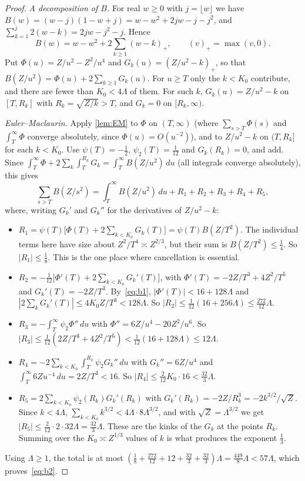 \begin{proof}
\emph{A decomposition of $B$.} For real $w\ge0$ with $j=\lfloor w\rfloor$ we have $B(w)=(w-j)(1-w+j)=w-w^2+2jw-j-j^2$, and $\sum_{k=1}^j2(w-k)=2jw-j^2-j$. Hence
\[
B(w)=w-w^2+2\sum_{k\ge1}(w-k)_+,\qquad(v)_+=\max(v,0).
\]
Put $\Phi(u)=Z/u^2-Z^2/u^4$ and $G_k(u)=(Z/u^2-k)_+$, so that $B(Z/u^2)=\Phi(u)+2\sum_{k\ge1}G_k(u)$. For $u\ge T$ only the $k<K_0$ contribute, and there are fewer than $K_0<4\Lambda$ of them. For such $k$, $G_k(u)=Z/u^2-k$ on $[T,R_k]$ with $R_k=\sqrt{Z/k}>T$, and $G_k=0$ on $[R_k,\infty)$.

\emph{Euler--Maclaurin.} Apply \cref{lem:EM} to $\Phi$ on $(T,\infty)$ (where $\sum_{s>T}\Phi(s)$ and $\int_T^\infty\Phi$ converge absolutely, since $\Phi(u)=O(u^{-2})$), and to $Z/u^2-k$ on $(T,R_k]$ for each $k<K_0$. Use $\psi(T)=-\frac12$, $\psi_2(T)=\frac1{12}$ and $G_k(R_k)=0$, and add. Since $\int_T^\infty\Phi+2\sum_k\int_T^{R_k}G_k=\int_T^\infty B(Z/u^2)\,du$ (all integrals converge absolutely), this gives
\[
\sum_{s>T}B(Z/s^2)=\int_T^\infty B(Z/u^2)\,du+R_1+R_2+R_3+R_4+R_5,
\]
where, writing $G_k'$ and $G_k''$ for the derivatives of $Z/u^2-k$:
\begin{itemize}
\item $R_1=\psi(T)\bigl[\Phi(T)+2\sum_{k<K_0}G_k(T)\bigr]=\psi(T)B(Z/T^2)$. The individual terms here have size about $Z^2/T^4\asymp Z^{2/3}$, but their sum is $B(Z/T^2)\le\frac14$. So $|R_1|\le\frac18$. This is the one place where cancellation is essential.
\item $R_2=-\frac1{12}\bigl[\Phi'(T)+2\sum_{k<K_0}G_k'(T)\bigr]$, with $\Phi'(T)=-2Z/T^3+4Z^2/T^5$ and $G_k'(T)=-2Z/T^3$. By~\eqref{eq:b1}, $|\Phi'(T)|<16+128\Lambda$ and $|2\sum_kG_k'(T)|\le4K_0Z/T^3<128\Lambda$. So $|R_2|\le\frac1{12}(16+256\Lambda)\le\frac{272}{12}\Lambda$.
\item $R_3=-\int_T^\infty\psi_2\Phi''\,du$ with $\Phi''=6Z/u^4-20Z^2/u^6$. So $|R_3|\le\frac1{12}(2Z/T^3+4Z^2/T^5)<\frac1{12}(16+128\Lambda)\le12\Lambda$.
\item $R_4=-2\sum_{k<K_0}\int_T^{R_k}\psi_2G_k''\,du$ with $G_k''=6Z/u^4$ and $\int_T^\infty6Zu^{-4}\,du=2Z/T^3<16$. So $|R_4|\le\frac2{12}K_0\cdot16<\frac{32}3\Lambda$.
\item $R_5=2\sum_{k<K_0}\psi_2(R_k)G_k'(R_k)$ with $G_k'(R_k)=-2Z/R_k^3=-2k^{3/2}/\sqrt Z$. Since $k<4\Lambda$, $\sum_{k<K_0}k^{3/2}<4\Lambda\cdot8\Lambda^{3/2}$, and with $\sqrt Z=\Lambda^{3/2}$ we get $|R_5|\le\frac2{12}\cdot2\cdot32\Lambda=\frac{32}3\Lambda$. These are the kinks of the $G_k$ at the points $R_k$. Summing over the $K_0\asymp Z^{1/3}$ values of $k$ is what produces the exponent $\frac13$.
\end{itemize}
Using $\Lambda\ge1$, the total is at most $(\frac18+\frac{272}{12}+12+\frac{32}3+\frac{32}3)\Lambda=\frac{449}8\Lambda<57\Lambda$, which proves~\eqref{eq:b2}.


\end{proof}
